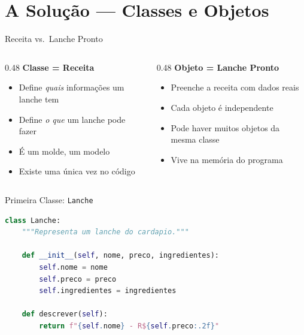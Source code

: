 \documentclass[aspectratio=169]{beamer}
\begin{document}
\section{A Solução --- Classes e Objetos}

\begin{frame}{Receita vs.\ Lanche Pronto}
  \begin{columns}[T]
    \begin{column}{0.48\textwidth}
      \textbf{Classe = Receita}
      \begin{itemize}
        \item Define \emph{quais} informações um lanche tem
        \item Define \emph{o que} um lanche pode fazer
        \item É um molde, um modelo
        \item Existe uma única vez no código
      \end{itemize}
    \end{column}
    \begin{column}{0.48\textwidth}
      \textbf{Objeto = Lanche Pronto}
      \begin{itemize}
        \item Preenche a receita com dados reais
        \item Cada objeto é independente
        \item Pode haver muitos objetos da mesma classe
        \item Vive na memória do programa
      \end{itemize}
    \end{column}
  \end{columns}
\end{frame}

\begin{frame}[fragile]{Primeira Classe: \texttt{Lanche}}
  \begin{lstlisting}[language=Python]
class Lanche:
    """Representa um lanche do cardapio."""

    def __init__(self, nome, preco, ingredientes):
        self.nome = nome
        self.preco = preco
        self.ingredientes = ingredientes

    def descrever(self):
        return f"{self.nome} - R${self.preco:.2f}"
  \end{lstlisting}
\end{frame}
\end{document}
